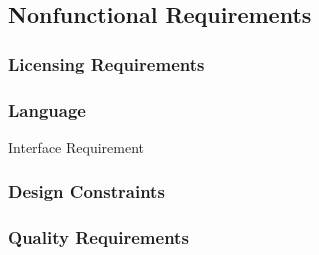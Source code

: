 \subsection{Nonfunctional Requirements}
\label{requirements:nonfunctional}

    \subsubsection{Licensing Requirements}
    \label{requirements:nonfunctional_start}
    \label{requirements:license}


    \subsubsection{Language}
    \label{requirements:language}


    \begin{requirement}{Interface Requirement}
    \end{requirement}



    \subsubsection{Design Constraints}
    \label{requirements:constraints}

    \subsubsection{Quality Requirements}
    \label{requirements:quality}


    \label{requirements:nonfunctional_end}
